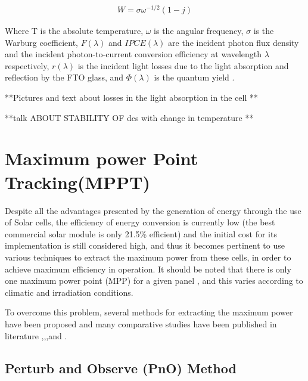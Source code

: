 {   \begin{equation}
     \begin{aligned}
     W = \sigma{\omega^{-1/2}}(1-\textit{j})
     \end{aligned}
    \end{equation}
    
Where T is the absolute temperature, $\omega$ is the angular frequency, $\sigma$ is the Warburg coefficient, $F(\lambda)$ and  $IPCE(\lambda)$ are the incident photon flux density and the incident photon-to-current conversion efficiency at wavelength $\lambda$ respectively, $r(\lambda)$ is the incident light losses due to the light absorption and reflection by the FTO glass, and $\Phi(\lambda)$ is the quantum yield \cite{yong2008modeling}.\newline

  




**Pictures and text about losses in the light absorption in the cell **

**talk ABOUT STABILITY OF dcs with change in temperature **

\section{Maximum power Point Tracking(MPPT)}


Despite all the advantages presented by the generation of energy through the use of Solar cells, the efficiency of energy conversion is currently low (the best commercial solar module is only 21.5\% efficient) and the initial cost for its implementation is still considered high, and thus it becomes pertinent to use various techniques to extract the maximum power from these cells, in order to achieve maximum efficiency in operation. It should be noted that there is only one maximum power point (MPP) for a given panel , and this varies according to climatic and irradiation conditions\cite{eltawil2013mppt}.

To overcome this problem, several methods for extracting the maximum power have been proposed and many comparative studies have been published in literature \cite{ngan2011study},\cite{esram2007comparison},\cite{eltawil2013mppt},\cite{reza2013classification}and \cite{faranda2008energy}. 

\subsection{Perturb and Observe (PnO) Method }


}
